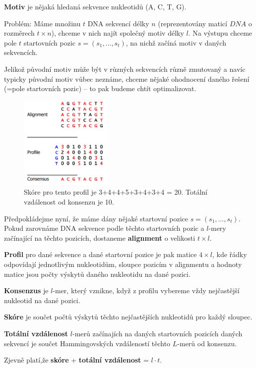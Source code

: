 \documentclass[11pt]{report} %
\numberwithin{equation}{section}
\begin{document}
\textbf{Motiv} je nějaká hledaná sekvence nukleotidů (A, C, T, G). 

Problém: Máme množinu $t$ DNA sekvencí délky $n$ (reprezentovány maticí $DNA$ o rozměrech $t\times n$), chceme v nich najít společný motiv délky $l$. Na výstupu chceme pole $t$ startovních pozic $s = (s_1, \dots, s_t)$, na nichž začíná motiv v daných sekvencích. 

Jelikož původní motiv může být v různých sekvencích různě zmutovaný a navíc typicky původní motiv vůbec neznáme, chceme nějaké ohodnocení daného řešení (=pole startovních pozic) -- to pak budeme chtít optimalizovat.

\begin{figure}
	\includegraphics[width=0.4\textwidth]{img/dna_profile.png}
	\caption{Skóre pro tento profil je 3+4+4+5+3+4+3+4 = 20. Totální vzdálenost od konsenzu je 10.}
\end{figure}
Předpokládejme nyní, že máme dány nějaké startovní pozice $s = (s_1, \dots, s_t)$. Pokud zarovnáme DNA sekvence podle těchto startovních pozic a  $l$-mery začínající na těchto pozicích, dostaneme \textbf{alignment} o velikosti $t \times l$. 

\textbf{Profil} pro dané sekvence a dané startovní pozice je pak matice $4 \times l$, kde řádky odpovídají jednotlivým nukleotidům, sloupce pozicím v alignmentu a hodnoty matice jsou počty výskytů daného nukleotidu na dané pozici. 

\textbf{Konsenzus} je $l$-mer, který vznikne, když z profilu vybereme vždy nejčastější nukleotid na dané pozici. 

\textbf{Skóre} je součet počtů výskytů těchto nejčastějších nukleotidů pro každý sloupec. 

\textbf{Totální vzdálenost} $l$-merů začínajích na daných startovních pozicích daných sekvencí je součet Hammingovských vzdáleností těchto $L$-merů od konsenzu. 

Zjevně platí,že \textbf{skóre} + \textbf{totální vzdálenost} = $l\cdot t$.
\end{document}
